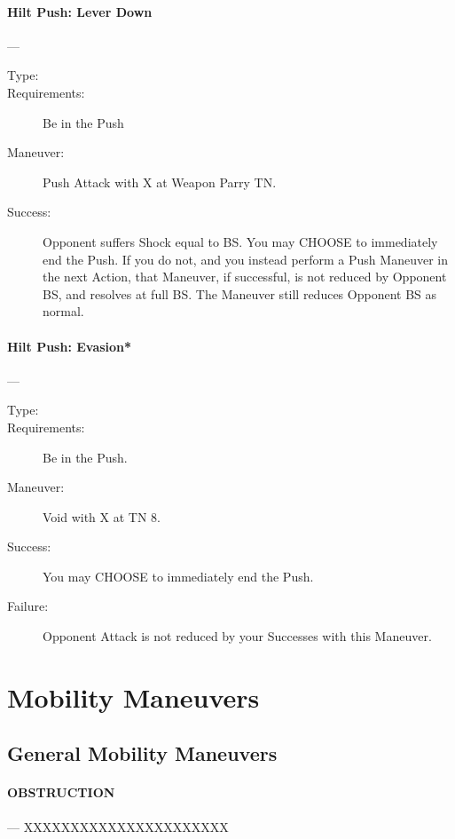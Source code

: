 \documentclass[oneside,11pt,english]{book}
\begin{document}
\paragraph{\large\label{man:Hilt Push: Lever Down} Hilt Push: Lever Down}---\quad{\large[2+X]}
\vspace{-10pt}\begin{description}
\item [Type:]
\item [Requirements:] Be in the Push 
\item [Maneuver:] Push Attack with X at Weapon Parry TN. 
\item [Success:] Opponent suffers Shock equal to BS. You may CHOOSE to immediately end the Push. If you 
do not, and you instead perform a Push Maneuver in the next Action, that Maneuver, if successful, is not 
reduced by Opponent BS, and resolves at full BS. The Maneuver still reduces Opponent BS as normal. 
\end{description}

\paragraph{\large\label{man:Hilt Push: Evasion*} Hilt Push: Evasion*}---\quad{\large[2+Encumbrance+X]}
\vspace{-10pt}\begin{description} 
\item [Type:] 
\item [Requirements:] Be in the Push. 
\item [Maneuver:] Void with X at TN 8. 
\item [Success:] You may CHOOSE to immediately end the Push. 
\item [Failure:] Opponent Attack is not reduced by your Successes with this Maneuver. 
\end{description}
\section{Mobility Maneuvers}
\subsection{General Mobility Maneuvers}
\paragraph{\large\label{man:OBSTRUCTION} OBSTRUCTION}---\quad{\large[????????]}
XXXXXXXXXXXXXXXXXXXXXX 
\end{document}
